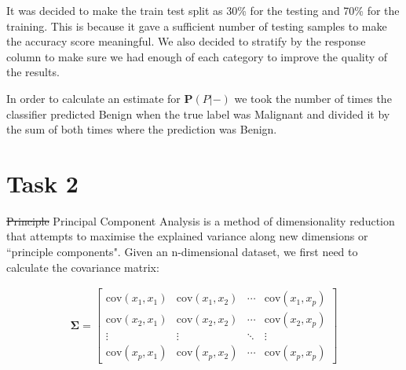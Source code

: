 \documentclass{article}
\begin{document}
	It was decided to make the train test split as 30\% for the testing and 70\% for the training. This is because it gave a sufficient number of testing samples to make the accuracy score meaningful. We also decided to stratify by the response column to make sure we had enough of each category to improve the quality of the results. 
	
	In order to calculate an estimate for $ \mathbf{P}(P | -) $ we took the number of times the classifier predicted Benign when the true label was Malignant and divided it by the sum of both times where the prediction was Benign. 
	
	\section{Task 2}	
	\sout{Principle} Principal Component Analysis is a method of dimensionality reduction that attempts to maximise the explained variance along new dimensions or ``principle components". Given an n-dimensional dataset, we first need to calculate the covariance matrix:
	
	\begin{align}
		\boldsymbol{\Sigma} = \begin{bmatrix}
			\mathrm{cov}(x_1, x_1) & \mathrm{cov}(x_1, x_2) & \cdots & \mathrm{cov}(x_1, x_p) \\
			\mathrm{cov}(x_2, x_1) & \mathrm{cov}(x_2, x_2) & \cdots & \mathrm{cov}(x_2, x_p) \\
			\vdots & \vdots & \ddots & \vdots \\
			\mathrm{cov}(x_p, x_1) & \mathrm{cov}(x_p, x_2) & \cdots & \mathrm{cov}(x_p, x_p)
		\end{bmatrix}
	\end{align}
\end{document}
